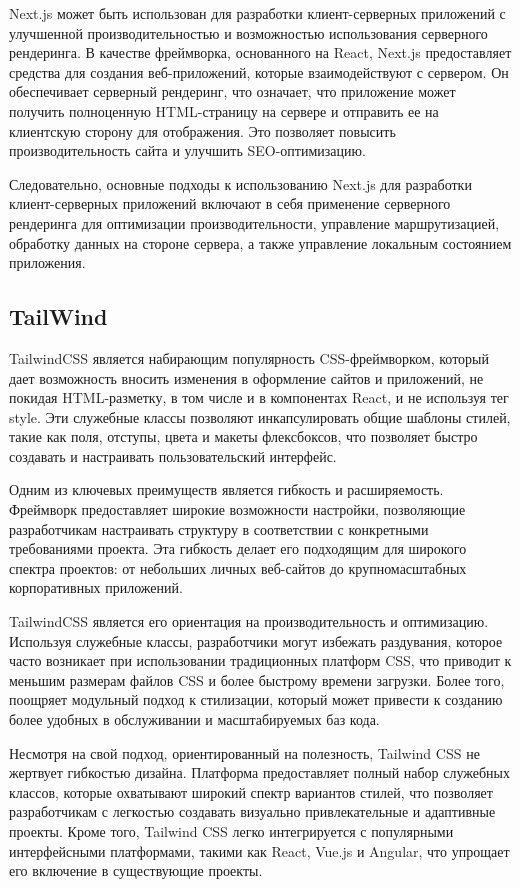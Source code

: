 \documentclass[master, och, pract]{SCWorks}
\begin{document}
Next.js может быть использован для разработки клиент-серверных приложений с улучшенной производительностью и возможностью использования серверного рендеринга. В качестве фреймворка, основанного на React, Next.js предоставляет средства для создания веб-приложений, которые взаимодействуют с сервером. Он обеспечивает серверный рендеринг, что означает, что приложение может получить полноценную HTML-страницу на сервере и отправить ее на клиентскую сторону для отображения. Это позволяет повысить производительность сайта и улучшить SEO-оптимизацию.

Следовательно, основные подходы к использованию Next.js для разработки клиент-серверных приложений включают в себя применение серверного рендеринга для оптимизации производительности, управление маршрутизацией, обработку данных на стороне сервера, а также управление локальным состоянием приложения.




\subsection{TailWind}
TailwindCSS является набирающим популярность CSS-фреймворком, который дает возможность вносить изменения в оформление сайтов и приложений, не покидая HTML-разметку, в том числе и в компонентах React, и не используя тег style. Эти служебные классы позволяют инкапсулировать общие шаблоны стилей, такие как поля, отступы, цвета и макеты флексбоксов, что позволяет быстро создавать и настраивать пользовательский интерфейс\cite{Tailwind}.

Одним из ключевых преимуществ является гибкость и расширяемость. Фреймворк предоставляет широкие возможности настройки, позволяющие разработчикам настраивать структуру в соответствии с конкретными требованиями проекта. Эта гибкость делает его подходящим для широкого спектра проектов: от небольших личных веб-сайтов до крупномасштабных корпоративных приложений.

TailwindCSS является его ориентация на производительность и оптимизацию. Используя служебные классы, разработчики могут избежать раздувания, которое часто возникает при использовании традиционных платформ CSS, что приводит к меньшим размерам файлов CSS и более быстрому времени загрузки. Более того, поощряет модульный подход к стилизации, который может привести к созданию более удобных в обслуживании и масштабируемых баз кода.

Несмотря на свой подход, ориентированный на полезность, Tailwind CSS не жертвует гибкостью дизайна. Платформа предоставляет полный набор служебных классов, которые охватывают широкий спектр вариантов стилей, что позволяет разработчикам с легкостью создавать визуально привлекательные и адаптивные проекты. Кроме того, Tailwind CSS легко интегрируется с популярными интерфейсными платформами, такими как React, Vue.js и Angular, что упрощает его включение в существующие проекты\cite{Fain_2022}.
\end{document}
